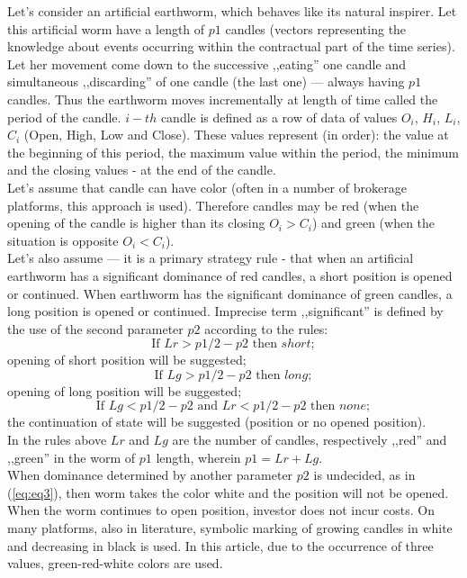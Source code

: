 \documentclass[runningheads,a4paper]{llncs}
\begin{document}
Let's consider an artificial earthworm, which behaves like its natural inspirer. Let this artificial worm have a length of $p1$ candles (vectors representing the knowledge about events occurring within the contractual part of the time series). Let her movement come down to the successive ,,eating'' one candle and simultaneous ,,discarding'' of one candle (the last one) --- always having $p1$ candles. Thus the earthworm moves incrementally at length of time called the period of the candle. $i-th$ candle is  defined as a row of data of values  $O_i$, $H_i$, $L_i$, $C_i$ (Open, High, Low and Close). These values represent (in order): the value at the beginning of this period, the maximum value within the period, the minimum and the closing values - at the end of the candle.\\
Let's assume that candle can have color (often in a number of brokerage platforms, this approach is used). Therefore candles may be red (when the opening of the candle is higher than its closing $O_i>C_i$) and green (when the situation is opposite $O_i<C_i$).\\
Let's also assume --- it is a primary strategy rule - that when an artificial earthworm has a significant dominance of red candles, a short position is opened or continued. When earthworm has the significant dominance of green candles, a long position is opened or continued. Imprecise term ,,significant'' is defined by the use of the second parameter $p2$ according to the rules:
\begin{equation}
\text{If }  Lr > p1/2 -p2 \text{ then } short;
\end{equation}
opening of short position will be suggested;
\begin{equation}
\text{If }  Lg > p1/2 -p2 \text{ then } long;
\end{equation}
opening of long position will be suggested;
\begin{equation}
\text{If }  Lg < p1/2 -p2 \text{ and } Lr< p1/2-p2 \text{ then } none;
\label{eq:eq3}
\end{equation}
the continuation of state will be suggested (position or no opened position).\\

In the rules above $Lr$ and $Lg$ are the number of candles, respectively ,,red'' and ,,green'' in the worm of $p1$ length, wherein $p1 = Lr + Lg$.\\
When dominance determined by another parameter $p2$ is undecided, as in (\ref{eq:eq3}), then worm takes the color white and the position will not be opened. When the worm continues to open position, investor does not incur costs. On many platforms, also in literature, symbolic marking of growing candles in white and decreasing in black is used. In this article, due to the occurrence of three values, green-red-white colors are used.\\
\end{document}
